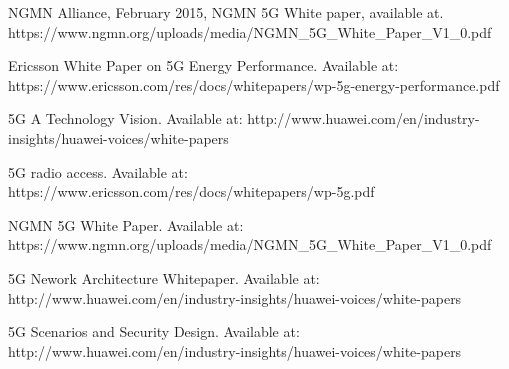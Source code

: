 \documentclass[lnicst,sechang,a4paper]{svmultln}
\begin{document}
\begin{thebibliography}{4}
 NGMN Alliance, February 2015, NGMN 5G White paper, available at. https://www.ngmn.org/uploads/media/NGMN\_5G\_White\_Paper\_V1\_0.pdf


 Ericsson White Paper on 5G Energy Performance. Available at: https://www.ericsson.com/res/docs/whitepapers/wp-5g-energy-performance.pdf

 5G A Technology Vision. Available at: http://www.huawei.com/en/industry-insights/huawei-voices/white-papers

 5G radio
access. Available at: https://www.ericsson.com/res/docs/whitepapers/wp-5g.pdf

 NGMN 5G White Paper. Available at: https://www.ngmn.org/uploads/media/NGMN\_5G\_White\_Paper\_V1\_0.pdf

 5G Nework Architecture Whitepaper. Available at: http://www.huawei.com/en/industry-insights/huawei-voices/white-papers

 5G Scenarios and Security Design. Available at: http://www.huawei.com/en/industry-insights/huawei-voices/white-papers



\end{thebibliography}
\end{document}
